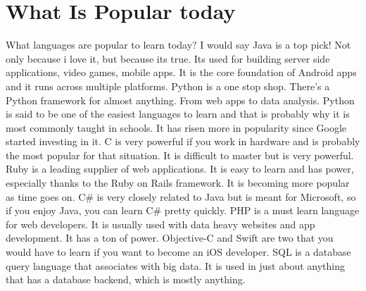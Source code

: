 \documentclass[letterpaper, 10 pt, conference]{IEEEtran}
\begin{document}
\section{What Is Popular today}
\indent What languages are popular to learn today? I would say Java is a top pick! Not only because i love it, but because its true. Its used for building server side applications, video games, mobile apps. It is the core foundation of Android apps and it runs across multiple platforms. Python is a one stop shop. There's a Python framework for almost anything. From web apps to data analysis. Python is said to be one of the easiest languages to learn and that is probably why it is most commonly taught in schools. It has risen more in popularity since Google started investing in it. C is very powerful if you work in hardware and is probably the most popular for that situation. It is difficult to master but is very powerful. Ruby is a leading supplier of web applications. It is easy to learn and has power, especially thanks to the Ruby on Rails framework. It is becoming more popular as time goes on. C\# is very closely related to Java but is meant for Microsoft, so if you enjoy Java, you can learn C\# pretty quickly. PHP is a must learn language for web developers. It is usually used with data heavy websites and app development. It has a ton of power. Objective-C and Swift are two that you would have to learn if you want to become an iOS developer. SQL is a database query language that associates with big data. It is used in just about anything that has a database backend, which is mostly anything.

\end{document}
